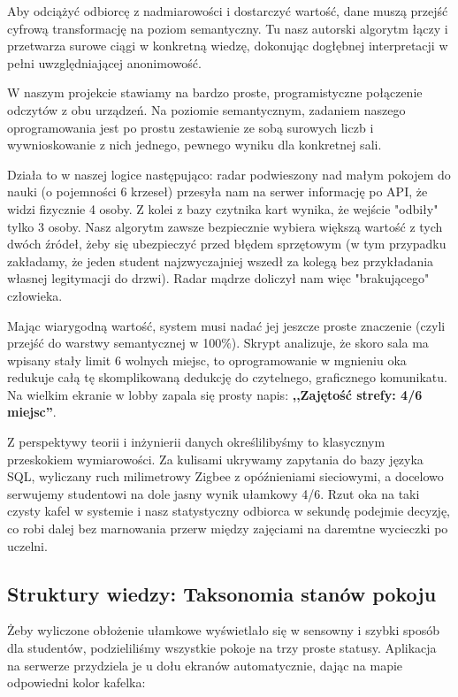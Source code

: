 \documentclass[14pt,a4paper]{extarticle}
\begin{document}
Aby odciążyć odbiorcę z nadmiarowości i dostarczyć wartość, dane muszą przejść cyfrową transformację na poziom semantyczny. Tu nasz autorski algorytm łączy i przetwarza surowe ciągi w konkretną wiedzę, dokonując dogłębnej interpretacji w pełni uwzględniającej anonimowość.

W naszym projekcie stawiamy na bardzo proste, programistyczne połączenie odczytów z obu urządzeń. Na poziomie semantycznym, zadaniem naszego oprogramowania jest po prostu zestawienie ze sobą surowych liczb i wywnioskowanie z nich jednego, pewnego wyniku dla konkretnej sali.

Działa to w naszej logice następująco: radar podwieszony nad małym pokojem do nauki (o pojemności 6 krzeseł) przesyła nam na serwer informację po API, że widzi fizycznie 4 osoby. Z kolei z bazy czytnika kart wynika, że wejście "odbiły" tylko 3 osoby. Nasz algorytm zawsze bezpiecznie wybiera większą wartość z tych dwóch źródeł, żeby się ubezpieczyć przed błędem sprzętowym (w tym przypadku zakładamy, że jeden student najzwyczajniej wszedł za kolegą bez przykładania własnej legitymacji do drzwi). Radar mądrze doliczył nam więc "brakującego" człowieka.

Mając wiarygodną wartość, system musi nadać jej jeszcze proste znaczenie (czyli przejść do warstwy semantycznej w 100\%). Skrypt analizuje, że skoro sala ma wpisany stały limit 6 wolnych miejsc, to oprogramowanie w mgnieniu oka redukuje całą tę skomplikowaną dedukcję do czytelnego, graficznego komunikatu. Na wielkim ekranie w lobby zapala się prosty napis: \textbf{,,Zajętość strefy: 4/6 miejsc''}.

Z perspektywy teorii i inżynierii danych określilibyśmy to klasycznym przeskokiem wymiarowości. Za kulisami ukrywamy zapytania do bazy języka SQL, wyliczany ruch milimetrowy Zigbee z opóźnieniami sieciowymi, a docelowo serwujemy studentowi na dole jasny wynik ułamkowy 4/6. Rzut oka na taki czysty kafel w systemie i nasz statystyczny odbiorca w sekundę podejmie decyzję, co robi dalej bez marnowania przerw między zajęciami na daremtne wycieczki po uczelni.

\subsection{Struktury wiedzy: Taksonomia stanów pokoju}

Żeby wyliczone obłożenie ułamkowe wyświetlało się w sensowny i szybki sposób dla studentów, podzieliliśmy wszystkie pokoje na trzy proste statusy. Aplikacja na serwerze przydziela je u dołu ekranów automatycznie, dając na mapie odpowiedni kolor kafelka:
\end{document}
